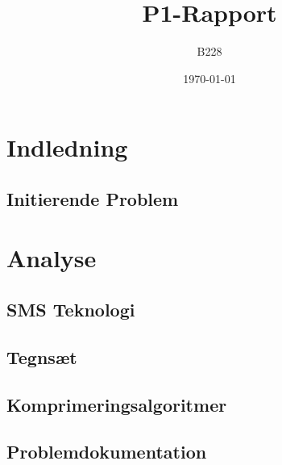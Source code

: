 \documentclass[12pt]{report}
\begin{document}
\setcounter{page}{2}


\begin{titlepage}
\title{P1-Rapport}
\author{B228}
\date{\today}
\pagebreak
\maketitle
\thispagestyle{empty}
\end{titlepage}

\tableofcontents
\thispagestyle{empty}

\renewcommand{\chaptername}{Kapitel}

\chapter{Indledning}
\setcounter{page}{3}
	
	\section{Initierende Problem}
	

\chapter{Analyse}

	\section{SMS Teknologi}
	
	
	\section{Tegnsæt}
	
	
	\section{Komprimeringsalgoritmer}
	
	
	\section{Problemdokumentation}
	
	
\end{document}

